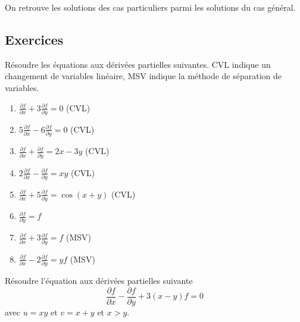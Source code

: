 \documentclass[12pt]{article}
\newcounter{exercice}
\newcounter{remarque}
\begin{document}
\begin{remarque}
On retrouve les solutions des cas particuliers parmi les solutions du cas général.
\end{remarque}

\subsection{Exercices}

\begin{exercice}
Résoudre les équations aux dérivées partielles suivantes. CVL indique un changement de variables linéaire, MSV indique la méthode de séparation de variables.
\begin{enumerate}
  \item $\frac{\partial f}{\partial x} + 3 \frac{\partial f}{\partial y} = 0$ (CVL)
  \item $5 \frac{\partial f}{\partial x} - 6 \frac{\partial f}{\partial y} = 0$ (CVL)
  \item $\frac{\partial f}{\partial x} + \frac{\partial f}{\partial y} = 2x - 3y$ (CVL)
  \item $2 \frac{\partial f}{\partial x} - \frac{\partial f}{\partial y} = xy$ (CVL)
  \item $\frac{\partial f}{\partial x} + 5 \frac{\partial f}{\partial y} = \cos(x+y)$ (CVL)
  \item $\frac{\partial f}{\partial y} = f$
  \item $\frac{\partial f}{\partial x} + 3 \frac{\partial f}{\partial y} = f$ (MSV)
  \item $\frac{\partial f}{\partial x} - 2 \frac{\partial f}{\partial y} = yf$ (MSV)
\end{enumerate}
\end{exercice}

\begin{exercice}
Résoudre l'équation aux dérivées partielles suivante
$$
\frac{\partial f}{\partial x} - \frac{\partial f}{\partial y} + 3(x-y) f = 0
$$
avec $u = xy$ et $v = x+y$ et $x > y$.
\end{exercice}
\end{document}
